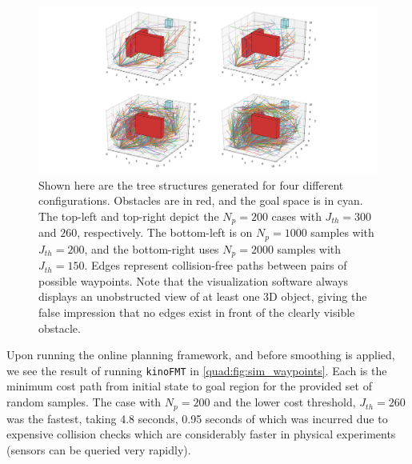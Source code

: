 \begin{figure}
    \centering
    \hspace*{-4.7cm}
    \includegraphics[scale=0.5]{./figures/sim_all_lines}
    \caption[Quadrotor simulation tree]{Shown here are the tree structures generated for four different configurations. Obstacles are in red, and the goal space is in cyan. The top-left and top-right depict the $N_p = 200$ cases with $J_{th} = 300$ and $260$, respectively. The bottom-left is on $N_p = 1000$ samples with $J_{th} = 200$, and the bottom-right uses $N_p = 2000$ samples with $J_{th} = 150$. Edges represent collision-free paths between pairs of possible waypoints. Note that the visualization software always displays an unobstructed view of at least one 3D object, giving the false impression that no edges exist in front of the clearly visible obstacle.}
\label{quad:fig:sim_all_lines}
\end{figure}

Upon running the online planning framework, and before smoothing is applied, we see the result of running \texttt{kinoFMT} in \autoref{quad:fig:sim_waypoints}. Each is the minimum cost path from initial state to goal region for the provided set of random samples. The case with $N_p = 200$ and the lower cost threshold, $J_{th} = 260$ was the fastest, taking 4.8 seconds, 0.95 seconds of which was incurred due to expensive collision checks which are considerably faster in physical experiments (sensors can be queried very rapidly). 

